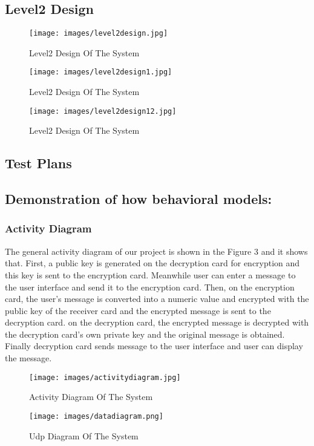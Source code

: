 \documentclass[12pt]{article}
\begin{document}
\vskip 10cm


\subsection{Level2 Design}
	\begin{figure}[H]
	\centering
	\label{Level2 Design Of The System}
	\texttt{[image: images/level2design.jpg]}\\[0.5 cm]	
	\caption{Level2 Design Of The System} 		
\end{figure}
	\begin{figure}[H]
	\centering
	\label{Level21 Design Of The System}
	\texttt{[image: images/level2design1.jpg]}\\[0.5 cm]	
	\caption{Level2 Design Of The System} 		
\end{figure}
	\begin{figure}[H]
	\centering
	\label{Level22 Design Of The System}
	\texttt{[image: images/level2design12.jpg]}\\[0.5 cm]	
	\caption{Level2 Design Of The System} 		
\end{figure}
\newpage
\subsection{Test Plans}
\subsection{Demonstration of how behavioral models:}
	
	\subsubsection{Activity Diagram}
	
 The general activity diagram of our project is shown in the Figure 3 and it shows that. First, a public key is generated on the decryption card for encryption and this key is sent to the encryption card. Meanwhile user can enter a message to the user interface and send it to the encryption card. Then, on the encryption card, the user's message is converted into a numeric value and encrypted with the public key of the receiver card and the encrypted message is sent to the decryption card. on the decryption card, the encrypted message is decrypted with the decryption card's own private key and the original message is obtained. Finally decryption card sends message to the user interface and user can display the message.
 	\begin{figure}[H]
 		\centering
 		\label{Uml Diagram Of The System}
 		\texttt{[image: images/activitydiagram.jpg]}\\[0.5 cm]	
 		\caption{Activity Diagram Of The System} 		
 	\end{figure}
 \newpage
 \begin{figure}[H]
 	\centering
 	\label{}
 	\texttt{[image: images/datadiagram.png]}\\[0.5 cm]	
 	\caption{Udp Diagram Of The System} 		
 \end{figure}
\end{document}
